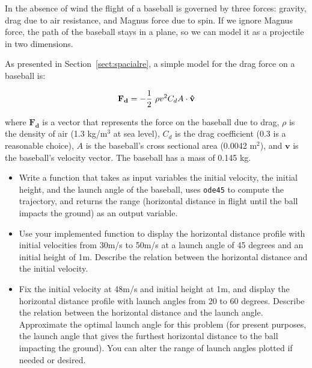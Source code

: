 \documentclass[
]{book}
\renewcommand{\vec}[1]{\bm{\mathbf{#1}}}
\newcommand{\uveci}{{\bm{\hat{\textnormal{\bfseries\i}}}}}
\newcommand{\uvecj}{{\bm{\hat{\textnormal{\bfseries\j}}}}}
\newcommand{\uvec}[1]{%
    \ifthenelse{\equal{#1}{i}}%
        {\uveci}{%
    \ifthenelse{\equal{#1}{j}}%
        {\uvecj}{%
    {\bm{\hat{\mathbf{#1}}}}%
}}}
\begin{document}
\begin{ex}
\label{ex:baseball}

In the absence of wind the flight of a baseball is governed by three forces: gravity,
drag due to air resistance, and Magnus force due to spin.  If
we ignore Magnus force, the path of the baseball stays
in a plane, so we can model it as a projectile in two
dimensions.

As presented in Section~\ref{sect:spacialre}, a simple model for the drag force
    on a baseball is:

\begin{equation}
    \vec{F_d} = - \frac{1}{2} ~ \rho v^2 C_d A \cdot \uvec{v}
\end{equation}

where $\vec{F_d}$ is a vector that represents the force on the baseball
    due to drag, $\rho$ is the density of air (1.3 kg/m$^3$ at sea
    level), $C_d$ is the drag coefficient (0.3 is a reasonable choice),
     $A$ is the baseball's cross sectional area (0.0042 m$^2$), and
    $\vec{v}$ is the baseball's velocity vector.  The baseball has a mass of
    0.145 kg.

\begin{itemize}

\item Write a function that takes
as input variables
the initial velocity, the initial height, and the launch angle of the baseball,
uses {\tt ode45} to compute
the trajectory, and returns the range (horizontal distance in flight until
the ball impacts the ground)
as an output variable.

\item Use your implemented function to display the horizontal distance profile
with initial velocities from 30m/s to 50m/s at a launch angle of 45 degrees
and an initial height of 1m.
Describe the relation between the horizontal distance and the initial velocity.

\item Fix the initial velocity at 48m/s and initial height at 1m, and display
the horizontal distance profile
with launch angles from 20 to 60 degrees. Describe the relation between
the horizontal distance and the launch angle.  Approximate the optimal
launch angle for this problem (for present purposes, the launch angle that gives the furthest horizontal distance to the ball impacting the ground).
You can alter the range of launch angles plotted if needed or desired.

\end{itemize}

\end{ex}
\end{document}
